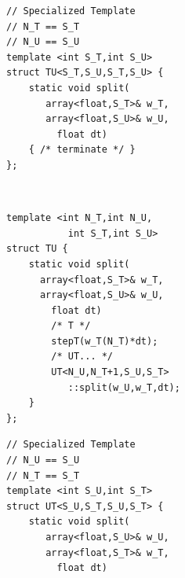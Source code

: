 \begin{figure}[h]
	\begin{minipage}[c]{\textwidth}
		\begin{minipage}[l][10cm][t]{.4\textwidth}
			\begin{minipage}[t]{\textwidth}
\begin{lstlisting}
// Specialized Template
// N_T == S_T
// N_U == S_U
template <int S_T,int S_U>
struct TU<S_T,S_U,S_T,S_U> {
	static void split(
	   array<float,S_T>& w_T,
	   array<float,S_U>& w_U,
		 float dt)
	{ /* terminate */ }
};
\end{lstlisting}
			\end{minipage} \\
			\vspace{5mm}
			\begin{minipage}[t]{\textwidth}
\begin{lstlisting}
template <int N_T,int N_U,
           int S_T,int S_U>
struct TU {
	static void split(
	  array<float,S_T>& w_T,
	  array<float,S_U>& w_U,
		float dt)
		/* T */
		stepT(w_T(N_T)*dt);
		/* UT... */
		UT<N_U,N_T+1,S_U,S_T>
		   ::split(w_U,w_T,dt);
	}
};
\end{lstlisting}
			\end{minipage}
	\end{minipage}
		\begin{minipage}[l][10cm][t]{.18\textwidth}
			\vspace{25mm}
		\end{minipage}
	\begin{minipage}[r][10cm][t]{.4\textwidth}
			\begin{minipage}[t]{\textwidth}
\begin{lstlisting}
// Specialized Template
// N_U == S_U
// N_T == S_T
template <int S_U,int S_T>
struct UT<S_U,S_T,S_U,S_T> {
	static void split(
	   array<float,S_U>& w_U,
	   array<float,S_T>& w_T,
		 float dt)

\end{lstlisting}
\end{minipage}
\end{minipage}
\end{minipage}
\end{figure}
